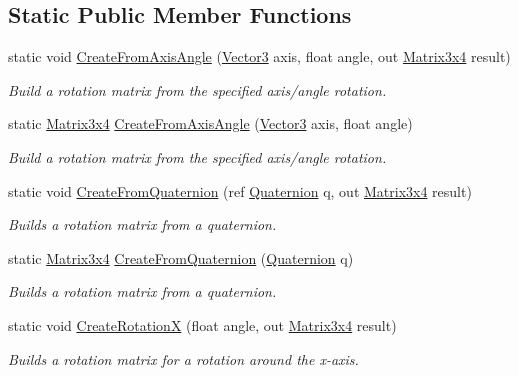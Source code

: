 \subsection*{Static Public Member Functions}
\begin{DoxyCompactItemize}
\item 
static void \hyperlink{struct_open_t_k_1_1_matrix3x4_ac418b9faf30180e5431573300c4f9f44}{Create\-From\-Axis\-Angle} (\hyperlink{struct_open_t_k_1_1_vector3}{Vector3} axis, float angle, out \hyperlink{struct_open_t_k_1_1_matrix3x4}{Matrix3x4} result)
\begin{DoxyCompactList}\small\item\em Build a rotation matrix from the specified axis/angle rotation. \end{DoxyCompactList}\item 
static \hyperlink{struct_open_t_k_1_1_matrix3x4}{Matrix3x4} \hyperlink{struct_open_t_k_1_1_matrix3x4_afceb5752b30740edd8ff7683f8a282bd}{Create\-From\-Axis\-Angle} (\hyperlink{struct_open_t_k_1_1_vector3}{Vector3} axis, float angle)
\begin{DoxyCompactList}\small\item\em Build a rotation matrix from the specified axis/angle rotation. \end{DoxyCompactList}\item 
static void \hyperlink{struct_open_t_k_1_1_matrix3x4_ac405157e5871f8e50b4d294a83a28af6}{Create\-From\-Quaternion} (ref \hyperlink{struct_open_t_k_1_1_quaternion}{Quaternion} q, out \hyperlink{struct_open_t_k_1_1_matrix3x4}{Matrix3x4} result)
\begin{DoxyCompactList}\small\item\em Builds a rotation matrix from a quaternion. \end{DoxyCompactList}\item 
static \hyperlink{struct_open_t_k_1_1_matrix3x4}{Matrix3x4} \hyperlink{struct_open_t_k_1_1_matrix3x4_ab0a4255224033eaf43ea054d183d4b97}{Create\-From\-Quaternion} (\hyperlink{struct_open_t_k_1_1_quaternion}{Quaternion} q)
\begin{DoxyCompactList}\small\item\em Builds a rotation matrix from a quaternion. \end{DoxyCompactList}\item 
static void \hyperlink{struct_open_t_k_1_1_matrix3x4_af707e729324651582a9480d6aa5b0d3f}{Create\-Rotation\-X} (float angle, out \hyperlink{struct_open_t_k_1_1_matrix3x4}{Matrix3x4} result)
\begin{DoxyCompactList}\small\item\em Builds a rotation matrix for a rotation around the x-\/axis. \end{DoxyCompactList}\item 

\end{DoxyCompactItemize}
